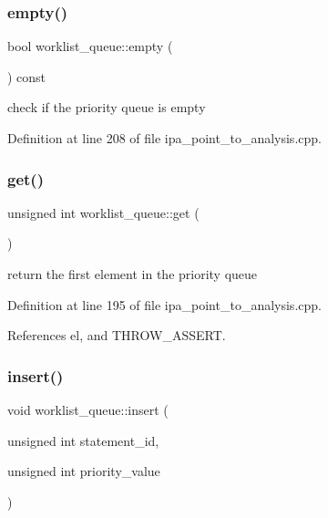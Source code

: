 \subsubsection{\texorpdfstring{empty()}{empty()}}
{\footnotesize\ttfamily bool worklist\+\_\+queue\+::empty (\begin{DoxyParamCaption}{ }\end{DoxyParamCaption}) const\hspace{0.3cm}{\ttfamily [inline]}}



check if the priority queue is empty 



Definition at line 208 of file ipa\+\_\+point\+\_\+to\+\_\+analysis.\+cpp.

\mbox{\label{classworklist__queue_afcc59df2bdec60bbe84e3b2b56c352a3}} 
\subsubsection{\texorpdfstring{get()}{get()}}
{\footnotesize\ttfamily unsigned int worklist\+\_\+queue\+::get (\begin{DoxyParamCaption}{ }\end{DoxyParamCaption})\hspace{0.3cm}{\ttfamily [inline]}}



return the first element in the priority queue 



Definition at line 195 of file ipa\+\_\+point\+\_\+to\+\_\+analysis.\+cpp.



References el, and T\+H\+R\+O\+W\+\_\+\+A\+S\+S\+E\+RT.

\mbox{\label{classworklist__queue_a544824f2c8a6131ddb2fc05d101622a4}} 
\subsubsection{\texorpdfstring{insert()}{insert()}}
{\footnotesize\ttfamily void worklist\+\_\+queue\+::insert (\begin{DoxyParamCaption}\item[{unsigned int}]{statement\+\_\+id,  }\item[{unsigned int}]{priority\+\_\+value }\end{DoxyParamCaption})\hspace{0.3cm}{\ttfamily [inline]}}



